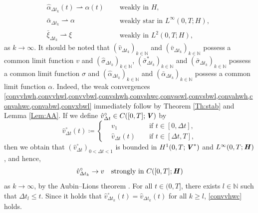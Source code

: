 \documentclass[11pt, a4paper]{article}
\newcommand{\N}{{\mathbb N}}
\newcommand{\defeq}{\coloneqq}
\newcommand{\dt}{{\Delta t}}
\newcommand{\bm}[1]{\textbf{\textit{#1}}}%
\newcommand{\Hv}{{\bm{H}}}
\newcommand{\Vv}{{\bm{V}}}
\newcommand{\Hs}{{H}}
\begin{document}
\begin{align}
    \hat{\alpha}_{\dt_k}(t) \rightharpoonup \alpha(t)
    &\quad\begin{aligned}\label{convahwc}
        \text{weakly in }\Hs,
    \end{aligned}\\
    \bar{\alpha}_{\dt_k} \rightharpoonup \alpha
    &\quad\begin{aligned}\label{convabwl}
        \text{weakly star in }L^\infty(0,T;\Hs),
    \end{aligned}\\
    \bar{\xi}_{\dt_k}\rightharpoonup \xi
    &\quad\begin{aligned}\label{convxbwl}
        \text{weakly in }L^2(0,T;\Hs),
    \end{aligned}
\end{align}
as $k\rightarrow\infty$. It should be noted that 
    $(\hat{v}_{\dt_k})_{k\in\N}$ and $(\bar{v}_{\dt_k})_{k\in\N}$ possess a common limit function $v$ and 
    $(\hat{\sigma}_{\dt_k})_{k\in\N}$, $(\bar{\sigma}^*_{\dt_k})_{k\in\N}$ and $(\bar{\sigma}_{\dt_k})_{k\in\N}$ possess a common limit function $\sigma$ and 
    $(\hat{\alpha}_{\dt_k})_{k\in\N}$ and $(\bar{\alpha}_{\dt_k})_{k\in\N}$ possess a common limit function $\alpha$. 
Indeed, the weak convergences \cref{convvhwh,convvhwl,convvbwl,convshwh,convshwc,convsswl,convsbwl,convahwh,convahwc,convabwl,convxbwl} immediately follow by Theorem \ref{Th:stab} and Lemma \ref{Lem:AA}.
If we define $\hat{v}_\dt^\circ \in C([0,T];\Vv)$ by 
\[
    \hat{v}_\dt^\circ(t)\defeq\left\{\begin{aligned}
        &v_1 &&\mbox{ if }t\in[0,\dt],\\
        &\hat{v}_\dt(t) &&\mbox{ if }t\in[\dt,T],
    \end{aligned}\right.
\]
then we obtain that $(\hat{v}_\dt^\circ)_{0<\dt<1}$ is bounded in $H^1(0,T;\Vv^*)$ and $L^\infty(0,T;\Hv)$, and hence, 
\[
    \hat{v}_{\dt_k}^\circ \rightarrow v 
    \quad\mbox{strongly in }C([0,T];\Hv)
\]
as $k\rightarrow\infty$, by the Aubin--Lions theorem \cite[Theorem II.5.16]{BF13}.
For all $t\in(0,T]$, there exists $l\in\N$ such that $\dt_l \le t$. Since it holds that $\hat{v}_{\dt_k}^\circ(t)=\hat{v}_{\dt_k}(t)$ for all $k \ge l$, \eqref{convvhwc} holds.
\end{document}
